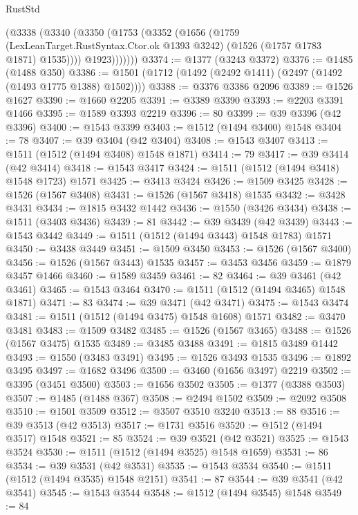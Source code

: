 \begin{lexlean}{RustStd}
\begin{coremodule}
{{          (@3338
            (@3340
              (@3350
                (@1753
                  (@3352
                    (@1656
                      (@1759
                        (LexLeanTarget.RustSyntax.Ctor.ok @1393 @3242)
                        (@1526 (@1757 @1783 @1871) @1535))))
                  @1923)))))))
@3374 := @1377 (@3243 @3372)
@3376 := @1485 (@1488 @350)
@3386 := @1501 (@1712 (@1492 (@2492 @1411) (@2497 (@1492 (@1493 @1775 @1388) @1502))))
@3388 := @3376 @3386 @2096
@3389 := @1526 @1627
@3390 := @1660 @2205
@3391 := @3389 @3390
@3393 := @2203 @3391 @1466
@3395 := @1589 @3393 @2219
@3396 := 80
@3399 := @39 @3396 (@42 @3396)
@3400 := @1543 @3399
@3403 := @1512 (@1494 @3400) @1548
@3404 := 78
@3407 := @39 @3404 (@42 @3404)
@3408 := @1543 @3407
@3413 := @1511 (@1512 (@1494 @3408) @1548 @1871)
@3414 := 79
@3417 := @39 @3414 (@42 @3414)
@3418 := @1543 @3417
@3424 := @1511 (@1512 (@1494 @3418) @1548 @1723) @1571
@3425 := @3413 @3424
@3426 := @1509 @3425
@3428 := @1526 (@1567 @3408)
@3431 := @1526 (@1567 @3418) @1535
@3432 := @3428 @3431
@3434 := @1815 @3432 @1442
@3436 := @1550 (@3426 @3434)
@3438 := @1511 (@3403 @3436)
@3439 := 81
@3442 := @39 @3439 (@42 @3439)
@3443 := @1543 @3442
@3449 := @1511 (@1512 (@1494 @3443) @1548 @1783) @1571
@3450 := @3438 @3449
@3451 := @1509 @3450
@3453 := @1526 (@1567 @3400)
@3456 := @1526 (@1567 @3443) @1535
@3457 := @3453 @3456
@3459 := @1879 @3457 @1466
@3460 := @1589 @3459
@3461 := 82
@3464 := @39 @3461 (@42 @3461)
@3465 := @1543 @3464
@3470 := @1511 (@1512 (@1494 @3465) @1548 @1871)
@3471 := 83
@3474 := @39 @3471 (@42 @3471)
@3475 := @1543 @3474
@3481 := @1511 (@1512 (@1494 @3475) @1548 @1608) @1571
@3482 := @3470 @3481
@3483 := @1509 @3482
@3485 := @1526 (@1567 @3465)
@3488 := @1526 (@1567 @3475) @1535
@3489 := @3485 @3488
@3491 := @1815 @3489 @1442
@3493 := @1550 (@3483 @3491)
@3495 := @1526 @3493 @1535
@3496 := @1892 @3495
@3497 := @1682 @3496
@3500 := @3460 (@1656 @3497) @2219
@3502 := @3395 (@3451 @3500)
@3503 := @1656 @3502
@3505 := @1377 (@3388 @3503)
@3507 := @1485 (@1488 @367)
@3508 := @2494 @1502
@3509 := @2092 @3508
@3510 := @1501 @3509
@3512 := @3507 @3510 @3240
@3513 := 88
@3516 := @39 @3513 (@42 @3513)
@3517 := @1731 @3516
@3520 := @1512 (@1494 @3517) @1548
@3521 := 85
@3524 := @39 @3521 (@42 @3521)
@3525 := @1543 @3524
@3530 := @1511 (@1512 (@1494 @3525) @1548 @1659)
@3531 := 86
@3534 := @39 @3531 (@42 @3531)
@3535 := @1543 @3534
@3540 := @1511 (@1512 (@1494 @3535) @1548 @2151)
@3541 := 87
@3544 := @39 @3541 (@42 @3541)
@3545 := @1543 @3544
@3548 := @1512 (@1494 @3545) @1548
@3549 := 84
}}
\end{coremodule}
\end{lexlean}
